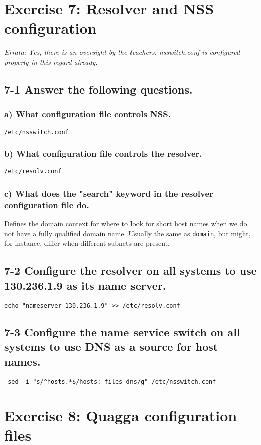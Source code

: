 \section{Exercise 7: Resolver and NSS configuration}
\emph{Errata: Yes, there is an oversight by the teachers. nsswitch.conf is configured properly in this regard already.}
\subsection{7-1 Answer the following questions.}

\subsubsection{a) What configuration file controls NSS.}
\verb=/etc/nsswitch.conf=

\subsubsection{b) What configuration file controls the resolver.}
\verb=/etc/resolv.conf=

\subsubsection{c) What does the "search" keyword in the resolver configuration file do.}
Defines the domain context for where to look for short host names when we do not have a fully qualified domain name. Usually the same as \verb=domain=, but might, for instance, differ when different subnets are present.

\subsection{7-2 Configure the resolver on all systems to use 130.236.1.9 as its name server.}
\verb=echo "nameserver 130.236.1.9" >> /etc/resolv.conf=

\subsection{7-3 Configure the name service switch on all systems to use DNS as a source for host names.}
\verb= sed -i "s/^hosts.*$/hosts: files dns/g" /etc/nsswitch.conf=

\section{Exercise 8: Quagga configuration files}

